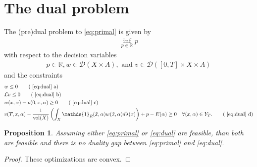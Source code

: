 \documentclass[12pt]{amsart}
\DeclareMathOperator{\vol}{vol}
\newtheorem{cor}[thm]{Corollary}
\newtheorem{prop}[thm]{Proposition}
\begin{document}

\section{The dual problem}
The (pre)dual problem to \eqref{eq:primal} is given by
\begin{align}
	\inf_{p \in \mathbb{R}} p  \label{eq:dual}
\end{align}
with respect to the decision variables
\begin{align*}
	p  \in \mathbb{R} , w \in \mathcal{D}(X \times A), \text{ and } v \in \mathcal{D}( [0,T] \times X \times A )
\end{align*}
and the constraints
\begin{align}
	&w \leq 0 \tag{ \ref{eq:dual} a} \label{w<0}  \\
	&\mathcal{L} v \leq 0  \tag{ \ref{eq:dual} b} \label{eq:Lyapunov} \\
	&w(x,\alpha) - v(0,x,\alpha) \geq 0   \tag{ \ref{eq:dual} c}  \label{eq:w>v_0} \\
	&v(T,x,\alpha) - \frac{1}{ \vol(X) } \left( \int_X \mathds{1}_R(\tilde{x},\alpha) w(\tilde{x},\alpha) d \lambda(x) \right)
		+ p - E(\alpha) \geq 0 \quad \forall (x,\alpha) \in Y_T.  \tag{ \ref{eq:dual} d}  \label{eq:funky}
\end{align}

\begin{prop} \label{prop:no gap}
	Assuming either \eqref{eq:primal} or \eqref{eq:dual} are feasible, than both are feasible and there is no duality gap between \eqref{eq:primal} and \eqref{eq:dual}.
\end{prop}
\begin{proof}
	These optimizations are convex.
\end{proof}
\end{document}
